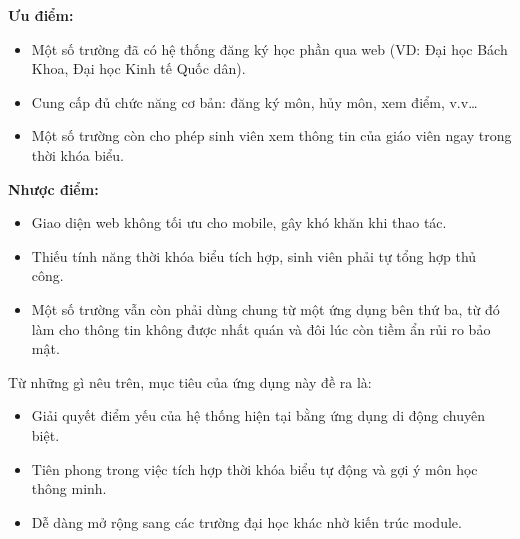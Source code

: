 \documentclass[../main.tex]{subfiles}
\begin{document}
\textbf{Ưu điểm:}
\begin{itemize}
    \item Một số trường đã có hệ thống đăng ký học phần qua web (VD: Đại học Bách Khoa, Đại học Kinh tế Quốc dân).
    \item Cung cấp đủ chức năng cơ bản: đăng ký môn, hủy môn, xem điểm, v.v\dots
    \item Một số trường còn cho phép sinh viên xem thông tin của giáo viên ngay trong thời khóa biểu.
\end{itemize}

\textbf{Nhược điểm:}
\begin{itemize}
    \item Giao diện web không tối ưu cho mobile, gây khó khăn khi thao tác.
    \item Thiếu tính năng thời khóa biểu tích hợp, sinh viên phải tự tổng hợp thủ công.
    \item Một số trường vẫn còn phải dùng chung từ một ứng dụng bên thứ ba, từ đó làm cho thông tin không được nhất quán và đôi lúc còn tiềm ẩn rủi ro bảo mật.
\end{itemize}

Từ những gì nêu trên, mục tiêu của ứng dụng này đề ra là:
\begin{itemize}
    \item Giải quyết điểm yếu của hệ thống hiện tại bằng ứng dụng di động chuyên biệt.
    \item Tiên phong trong việc tích hợp thời khóa biểu tự động và gợi ý môn học thông minh.
    \item Dễ dàng mở rộng sang các trường đại học khác nhờ kiến trúc module.
\end{itemize}
\end{document}
